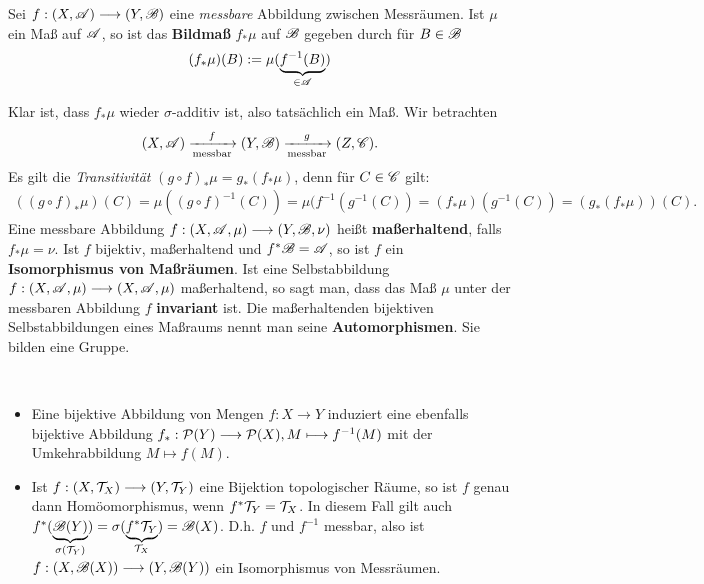 \begin{definition}
\begin{mdframed}
Sei $f:(X,\AA)\longrightarrow (Y,\BB)$ eine \emph{messbare} Abbildung zwischen Messräumen. Ist $\mu$ ein Maß auf $\AA$, so ist das \textbf{Bildmaß} $f_*\mu$ auf $\BB$ gegeben durch für $B\in \BB$
$$
(f_*\mu)(B):= \mu (\underbrace{f^{-1}(B)}_{\in \AA}) 
$$
\end{mdframed}
\end{definition}
Klar ist, dass $f_*\mu$ wieder $\sigma$-additiv ist, also tatsächlich ein Maß.
Wir betrachten
$$(X,\AA)\xrightarrow[\text{messbar}]{f} (Y,\BB) \xrightarrow[\text{messbar}]{g} (Z,\CC).$$
Es gilt die \emph{Transitivität} $(g\circ f)_* \mu = g_*(f_*\mu)$, denn für $C \in \CC$ gilt:
\begin{equation*}
\begin{split}
	((g\circ f)_* \mu) (C) = \mu ((g\circ f)^{-1}(C))	
								 = \mu(f^{-1}(g^{-1}(C))	
								 = (f_*\mu)(g^{-1}(C))		
								  = (g_*(f_*\mu))(C).
\end{split}
\end{equation*}
Eine messbare Abbildung $f:(X,\AA,\mu)\longrightarrow (Y,\BB,\nu)$ heißt \textbf{maßerhaltend}, falls $\boxed{f_*\mu=\nu}$. Ist $f$ bijektiv, maßerhaltend und $f^*\BB=\AA$, so ist $f$ ein \textbf{Isomorphismus von Maßräumen}. Ist eine Selbstabbildung $f:(X, \AA,\mu) \longrightarrow (X, \AA, \mu)$ maßerhaltend, so sagt man, dass das Maß $\mu$ unter der messbaren Abbildung $f$ \textbf{invariant} ist. Die maßerhaltenden bijektiven Selbstabbildungen eines Maßraums nennt man seine \textbf{Automorphismen}. Sie bilden eine Gruppe. 

\begin{remark}\
\begin{itemize}
\item
Eine bijektive Abbildung von Mengen $f:X \longrightarrow Y$ induziert eine ebenfalls bijektive Abbildung $f_*:\PP(Y) \longrightarrow \PP(X), M \longmapsto f^{-1}(M)$ mit der Umkehrabbildung $M\mapsto f(M)$. 
\item Ist  $f:(X,\TT_X) \longrightarrow (Y,\TT_Y)$ eine Bijektion topologischer Räume, so ist $f$ genau dann Homöomorphismus, wenn $f^*\TT_Y=\TT_X$.  In diesem Fall gilt auch $f^*(\underbrace{\BB(Y)}_{\sigma(\TT_Y)}) = \sigma (\underbrace{f^*\TT_Y}_{\TT_X}) = \BB(X)$. D.h. $f$ und $f^{-1}$ messbar, also ist $f:(X,\BB(X))\longrightarrow (Y,\BB(Y))$ ein Isomorphismus von Messräumen.
\end{itemize}
\end{remark}


